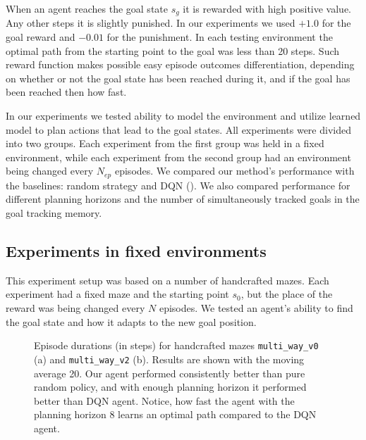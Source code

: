 \documentclass[a4paper,twoside]{article}
\begin{document}
When an agent reaches the goal state $s_g$ it is rewarded with high positive value. Any other steps it is slightly punished. In our experiments we used $+1.0$ for the goal reward and $-0.01$ for the punishment. In each testing environment the optimal path from the starting point to the goal was less than 20 steps. Such reward function makes possible easy episode outcomes differentiation, depending on whether or not the goal state has been reached during it, and if the goal has been reached then how fast.

In our experiments we tested ability to model the environment and utilize learned model to plan actions that lead to the goal states. All experiments were divided into two groups. Each experiment from the first group was held in a fixed environment, while each experiment from the second group had an environment being changed every $N_{ep}$ episodes. We compared our method's performance with the baselines: random strategy and DQN (\cite{Mnih_2015_Atari}). We also compared performance for different planning horizons and the number of simultaneously tracked goals in the goal tracking memory.

\subsection{Experiments in fixed environments}

This experiment setup was based on a number of handcrafted mazes. Each experiment had a fixed maze and the starting point $s_0$, but the place of the reward was being changed every $N$ episodes. We tested an agent's ability to find the goal state and how it adapts to the new goal position.

\begin{figure}
  \centering
  \begin{minipage}{\linewidth}
    
    \subcaption{}
    \vspace*{12pt}

    
    \subcaption{}
    \vspace*{6pt}
  \end{minipage}

  \caption{Episode durations (in steps) for handcrafted mazes \texttt{multi\_way\_v0} (a) and \texttt{multi\_way\_v2} (b). Results are shown with the moving average 20. Our agent performed consistently better than pure random policy, and with enough planning horizon it performed better than DQN agent. Notice, how fast the agent with the planning horizon $8$ learns an optimal path compared to the DQN agent.} \label{fig_comparison_mw}
\end{figure}
\end{document}
